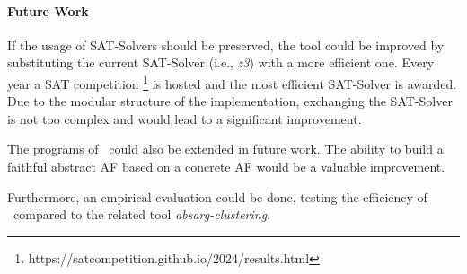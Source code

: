 \paragraph{Future Work} If the usage of SAT-Solvers should be preserved, the tool could be improved by substituting the current SAT-Solver (i.e., \emph{z3}) with a more efficient one. Every year a SAT competition \footnote{https://satcompetition.github.io/2024/results.html} is hosted and the most efficient SAT-Solver is awarded. Due to the modular structure of the implementation, exchanging the SAT-Solver is not too complex and would lead to a significant improvement.

The programs of \prog\ could also be extended in future work. The ability to build a faithful abstract AF based on a concrete AF would be a valuable improvement.

Furthermore, an empirical evaluation could be done, testing the efficiency of \prog\ compared to the related tool \emph{absarg-clustering}.